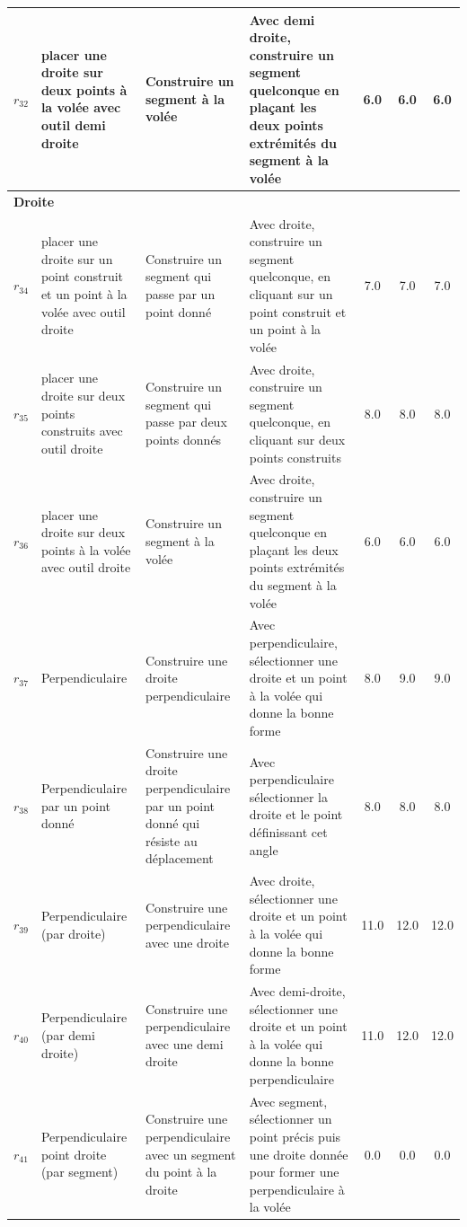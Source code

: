 \begin{longtable}{|c|p{3cm}|p{4cm}|p{4cm}|c|c|c|}
$r_{32}$\label{op_dte_pts_vol_out_demidte} & placer une droite sur deux points à la volée avec outil demi droite & Construire un segment à la volée & Avec demi droite, construire un segment quelconque en plaçant les deux points extrémités du segment à la volée & 6.0 & 6.0 & 6.0 \\ \hline
\multicolumn{7}{|l|}{\textbf{Droite}} \\ \hline
$r_{34}$\label{op_dte_pt_const_pt_vol_out_dte} & placer une droite sur un point construit et un point à la volée avec outil droite & Construire un segment qui passe par un point donné & Avec droite, construire un segment quelconque, en cliquant sur un point construit et un point à la volée & 7.0 & 7.0 & 7.0 \\ \hline
$r_{35}$\label{op_dte_pts_const_out_dte} & placer une droite sur deux points construits avec outil droite & Construire un segment qui passe par deux points donnés & Avec droite, construire un segment quelconque, en cliquant sur deux points construits & 8.0 & 8.0 & 8.0 \\ \hline
$r_{36}$\label{op_dte_pts_vol_out_dte} & placer une droite sur deux points à la volée avec outil droite & Construire un segment à la volée & Avec droite, construire un segment quelconque en plaçant les deux points extrémités du segment à la volée & 6.0 & 6.0 & 6.0 \\ \hline
$r_{37}$\label{op_perp} & Perpendiculaire & Construire une droite perpendiculaire & Avec perpendiculaire, sélectionner une droite et un point à la volée qui donne la bonne forme & 8.0 & 9.0 & 9.0 \\ \hline
$r_{38}$\label{op_perp_pt} & Perpendiculaire par un point donné & Construire une droite perpendiculaire par un point donné qui résiste au déplacement & Avec perpendiculaire sélectionner la droite et le point définissant cet angle & 8.0 & 8.0 & 8.0 \\ \hline
$r_{39}$\label{op_perp_dte} & Perpendiculaire (par droite) & Construire une perpendiculaire avec une droite & Avec droite,  sélectionner une droite et un point à la volée qui donne la bonne forme & 11.0 & 12.0 & 12.0 \\ \hline
$r_{40}$\label{op_perp_demi_dte} & Perpendiculaire (par demi droite) & Construire une perpendiculaire avec une demi droite & Avec demi-droite,  sélectionner une droite et un point à la volée qui donne la bonne perpendiculaire & 11.0 & 12.0 & 12.0 \\ \hline
$r_{41}$\label{op_perp_sgt_pt_dte} & Perpendiculaire  point droite (par segment) & Construire une perpendiculaire avec un segment du point à la droite & Avec segment,  sélectionner  un point précis puis une droite donnée pour former une perpendiculaire à la volée & 0.0 & 0.0 & 0.0 \\ \hline

\end{longtable}
